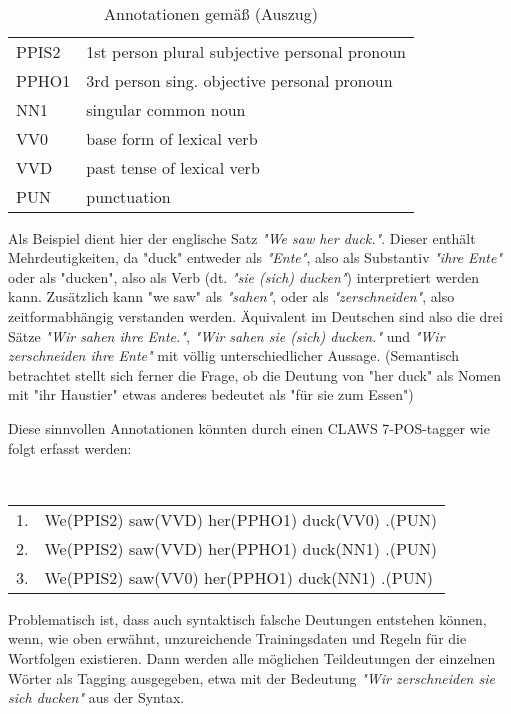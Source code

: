 \documentclass[12pt]{paper}
\begin{document}
\tt 
\begin{table}[h]
\begin{tabular}{ll}
PPIS2	& 1st person plural subjective personal pronoun \\
PPHO1	& 3rd person sing. objective personal pronoun\\
NN1		& singular common noun \\
VV0		& base form of lexical verb \\
VVD		& past tense of lexical verb \\
PUN		& punctuation
\end{tabular}
\caption{Annotationen gemäß \cite{clw7} (Auszug)}
\end{table} 

\rm

Als Beispiel dient hier der englische Satz \textit{"We saw her duck."}. Dieser enthält Mehrdeutigkeiten, da "duck" entweder als \textit{"Ente"}, also als Substantiv \textit{"ihre Ente"} oder als "ducken", also als Verb (dt. \textit{"sie (sich) ducken"}) interpretiert werden kann. Zusätzlich kann "we saw" als \textit{"sahen"}, oder als \textit{"zerschneiden"}, also zeitformabhängig verstanden werden. Äquivalent im Deutschen sind also die drei Sätze \textit{"Wir sahen ihre Ente."}, \textit{"Wir sahen sie (sich) ducken."} und \textit{"Wir zerschneiden ihre Ente"} mit völlig unterschiedlicher Aussage. (Semantisch betrachtet stellt sich ferner die Frage, ob die Deutung von "her duck" als Nomen mit "ihr Haustier" etwas anderes bedeutet als "für sie zum Essen")

Diese sinnvollen Annotationen könnten durch einen CLAWS 7-POS-tagger wie folgt erfasst werden:

\tt
\begin{tabular}{ll} 
1. & We(PPIS2) saw(VVD) her(PPHO1) duck(VV0) .(PUN) \\
2. & We(PPIS2) saw(VVD) her(PPHO1) duck(NN1) .(PUN) \\
3. & We(PPIS2) saw(VV0) her(PPHO1) duck(NN1) .(PUN) \\
\end{tabular} \rm

Problematisch ist, dass auch syntaktisch falsche Deutungen entstehen können, wenn, wie oben erwähnt, unzureichende Trainingsdaten und Regeln für die Wortfolgen existieren. Dann werden alle möglichen Teildeutungen der einzelnen Wörter als Tagging ausgegeben, etwa mit der Bedeutung \textit{"Wir zerschneiden sie sich ducken"} aus der Syntax.
\end{document}
